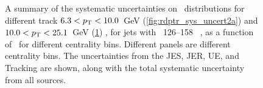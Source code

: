 \begin{figure}
\begin{subfigure}[b]{\textwidth}
    \caption{}
    \label{fig:rdptr_sys_uncert2b}
\end{subfigure}\hfill
   \caption{A summary of the systematic uncertainties on \RDptr\ distributions for different track \mbox{$6.3 < \mbox{$p_{\mathrm{T}}$} < 10.0$ GeV} (\ref{fig:rdptr_sys_uncert2a}) and \mbox{$10.0 < \mbox{$p_{\mathrm{T}}$} < 25.1$ GeV} (\ref{fig:rdptr_sys_uncert2b}) , for jets with \pt\ 126--158 \GeV\ , as a function of \rvar\ for different centrality bins.
Different panels are different centrality bins.
The uncertainties from the JES, JER, UE, and Tracking  are shown, along with the total systematic uncertainty from all sources.
}
\label{fig:rdptr_sys_uncert2}
\end{figure}


%
%
